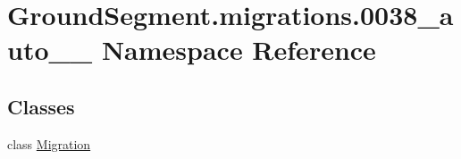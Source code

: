 \hypertarget{namespace_ground_segment_1_1migrations_1_10038__auto__20170131__1736}{}\section{Ground\+Segment.\+migrations.0038\+\_\+auto\+\_\+\_ Namespace Reference}
\label{namespace_ground_segment_1_1migrations_1_10038__auto__20170131__1736}
\subsection*{Classes}
\begin{DoxyCompactItemize}
\item 
class \hyperlink{class_ground_segment_1_1migrations_1_10038__auto__20170131__1736_1_1_migration}{Migration}
\end{DoxyCompactItemize}
